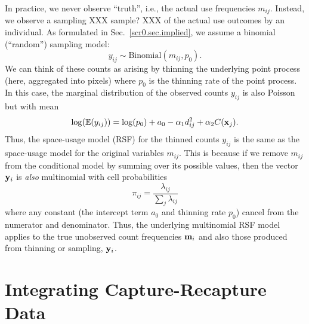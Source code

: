 In practice, we never observe ``truth'', i.e., the actual use
frequencies $m_{ij}$. Instead, we observe a sampling XXX sample? XXX of the actual use
outcomes by an individual.  As formulated in
Sec.~\ref{scr0.sec.implied}, we assume a binomial (``random'')
sampling model:
\[
 y_{ij} \sim \mbox{Binomial}(m_{ij}, p_{0}).
\]
We can think of these counts as arising by thinning the underlying
point process (here, aggregated into pixels) where $p_{0}$ is the
thinning rate of the point process.  
In this case, the marginal
distribution of the observed counts $y_{ij}$ is also Poisson but with mean
\[
 \log(\mathbb{E}(y_{ij}))  = \log(p_{0}) + a_{0} -\alpha_{1} d_{ij}^{2} +  \alpha_{2} C({\bf x}_{j}).
\]
Thus, the space-usage model (RSF) for the thinned counts $y_{ij}$ is
the same as the space-usage model for the original variables $m_{ij}$.
This is because if we remove $m_{ij}$ from the conditional model by
summing over its possible values, then the vector ${\bf y}_{i}$ is
{\it also} multinomial with cell probabilities
\[
\pi_{ij} = \frac{\lambda_{ij}}{\sum_{j} \lambda_{ij}}
\]
where any constant (the intercept term $a_0$ and thinning rate
$p_{0}$)
cancel 
from the numerator and denominator. Thus, the underlying multinomial
RSF model applies to the true unobserved count frequencies ${\bf
  m}_{i}$ and also those produced from thinning or sampling, ${\bf
  y}_{i}$.


\section{Integrating Capture-Recapture Data}

